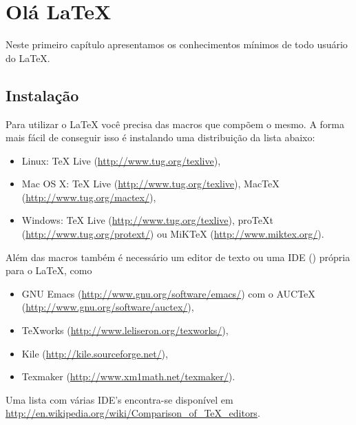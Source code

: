 \chapter{Olá \LaTeX} \label{sch:basic}
Neste primeiro capítulo apresentamos os conhecimentos mínimos de todo usuário
do LaTeX.

\section{Instalação}
Para utilizar o LaTeX você precisa das macros que compõem o mesmo. A forma mais
fácil de conseguir isso é instalando uma distribuição da lista abaixo:
\begin{itemize}
  \item Linux: TeX Live (\url{http://www.tug.org/texlive}),
  \item Mac OS X: TeX Live
    (\url{http://www.tug.org/texlive}), MacTeX
    (\url{http://www.tug.org/mactex/}),
  \item Windows: TeX Live
    (\url{http://www.tug.org/texlive}), proTeXt
    (\url{http://www.tug.org/protext/}) ou MiKTeX
    (\url{http://www.miktex.org/}).
\end{itemize}
Além das macros também é necessário um editor de texto ou uma IDE
() própria para o LaTeX, como
\begin{itemize}
  \item GNU Emacs
    (\url{http://www.gnu.org/software/emacs/}) com o AUCTeX
    (\url{http://www.gnu.org/software/auctex/}),
  \item TeXworks (\url{http://www.leliseron.org/texworks/}),
  \item Kile (\url{http://kile.sourceforge.net/}),
  \item Texmaker (\url{http://www.xm1math.net/texmaker/}).
\end{itemize}
Uma lista com várias IDE's encontra-se disponível em
\url{http://en.wikipedia.org/wiki/Comparison_of_TeX_editors}\nocite{Wikipedia:EN:Comparison_TeX_editors}.

